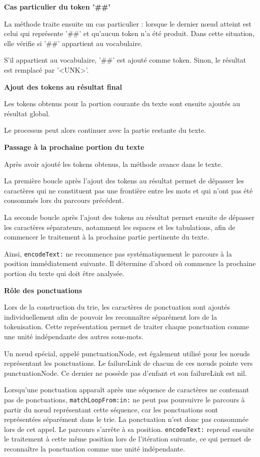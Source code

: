 \documentclass[12pt,a4paper]{report}
\begin{document}
	\textbf{Cas particulier du token '\#\#'}
	
	La méthode traite ensuite un cas particulier : lorsque le dernier nœud atteint est celui qui représente '\#\#' et qu'aucun token n'a été produit.	Dans cette situation, elle vérifie si '\#\#' appartient au vocabulaire.
	
	S'il appartient au vocabulaire, '\#\#' est ajouté comme token. Sinon, le résultat est remplacé par '<UNK>'.
	
	\textbf{Ajout des tokens au résultat final}
	
	Les tokens obtenus pour la portion courante du texte sont ensuite ajoutés au résultat global.
	
	Le processus peut alors continuer avec la partie restante du texte.
	
	\textbf{Passage à la prochaine portion du texte}
	
	Après avoir ajouté les tokens obtenus, la méthode avance dans le texte.
	
	La première boucle après l'ajout des tokens au résultat permet de dépasser les caractères qui ne constituent pas une frontière entre les mots et qui n'ont pas été consommés lors du parcours précédent.
	
	La seconde boucle après l'ajout des tokens au résultat permet ensuite de dépasser les caractères séparateurs, notamment les espaces et les tabulations, afin de commencer le traitement à la prochaine partie pertinente du texte.
	
	Ainsi, \texttt{encodeText:} ne recommence pas systématiquement le parcours à la position immédiatement suivante. Il détermine d'abord où commence la prochaine portion du texte qui doit être analysée.
	
	\textbf{Rôle des ponctuations}
	
	Lors de la construction du trie, les caractères de ponctuation sont ajoutés individuellement afin de pouvoir les reconnaître séparément lors de la tokenisation. Cette représentation permet de traiter chaque ponctuation comme une unité indépendante des autres sous-mots.
	
	Un nœud spécial, appelé punctuationNode, est également utilisé pour les nœuds représentant les ponctuations. Le failureLink de chacun de ces nœuds pointe vers punctuationNode. Ce dernier ne possède pas d'enfant et son failureLink est nil.
	
	Lorsqu'une ponctuation apparaît après une séquence de caractères ne contenant pas de ponctuations, \texttt{matchLoopFrom:in:} ne peut pas poursuivre le parcours à partir du nœud représentant cette séquence, car les ponctuations sont représentées séparément dans le trie. La ponctuation n'est donc pas consommée lors de cet appel. Le parcours s'arrête à sa position. \texttt{encodeText:} reprend ensuite le traitement à cette même position lors de l'itération suivante, ce qui permet de reconnaître la ponctuation comme une unité indépendante.
	
\end{document}
